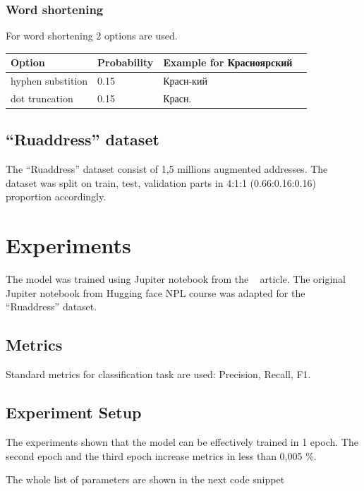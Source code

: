 \documentclass{article}
\begin{document}
\subsubsection{Word shortening}

For word shortening 2 options are used.


\begin{center}
    \begin{tabular}{| l | l | l |  l | }
        \hline
        Option & Probability & Example for Красноярский & \\
        \hline
        hyphen substition & 0.15 & Красн-кий  \\
        dot truncation & 0.15 & Красн.  \\
        \hline
    \end{tabular}
\end{center}


\subsection{``Ruaddress'' dataset}

The ``Ruaddress'' dataset consist of 1,5 millions augmented addresses.
The dataset was split on train, test, validation parts in 4:1:1 (0.66:0.16:0.16) proportion accordingly.


\section{Experiments}

The model was trained using Jupiter notebook  from the ~\cite{nlpcourse2022} article.
The original Jupiter notebook from Hugging face NPL course was adapted for the ``Ruaddress'' dataset.



\subsection{Metrics}
Standard metrics for classification task are used: Precision, Recall, F1.

\subsection{Experiment Setup}

The experiments shown that the model can be effectively trained in 1 epoch.
The second epoch and the third epoch increase metrics in less than 0,005 \%.

The whole list of parameters are shown in the next code snippet
\end{document}

